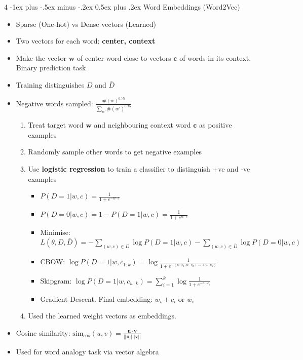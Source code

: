 \documentclass[10pt, landscape]{article}
\makeatletter
\renewcommand{\subsection}{\@startsection{subsection}{2}{0mm}%
  {-1ex plus -.5ex minus -.2ex}%
  {0.5ex plus .2ex}%
{\normalfont\normalsize\bfseries}}
\makeatother
\begin{document}
\begin{multicols*}{4}
  \subsection{Word Embeddings (Word2Vec)}    
  \begin{itemize}
    \item Sparse (One-hot) vs Dense vectors (Learned)
    \item Two vectors for each word: \textbf{center, context}
    \item Make the vector $\mathbf{w}$ of center word close to vectors $\mathbf{c}$ of words in its context. Binary prediction task
    \item Training distinguishes $D$ and $\bar{D}$
    \item Negative words sampled: $\frac{\#(w)^{0.75}}{\sum_{w'} \# (w')^0.75}$
    \begin{enumerate}
      \item Treat target word $\mathbf{w}$ and neighbouring context word $\mathbf{c}$ as positive examples
      \item Randomly sample other words to get negative examples
      \item Use \textbf{logistic regression} to train a classifier to distinguish +ve and -ve examples
      \begin{itemize}
        \item $P(D=1|w,c) = \frac{1}{1+e^{-w \cdot c}}$
        \item $P(D=0|w,c) = 1 - P(D=1|w,c) = \frac{1}{1+e^{w \cdot c}}$
        \item Minimise: $L(\theta, D, \bar{D}) = - \sum_{(w,c) \in D} \log P(D=1|w,c) - \sum_{(w,c) \in \bar{D}} \log P(D=0|w,c)$
        \item CBOW: $\log P(D=1|w,c_{1:k}) = \log \frac{1}{1 + e^{-(w \cdot c_1, w \cdot c_2+ \dots + w \cdot c_k)}}$
        \item Skipgram: $\log P(D=1|w,c_{w:k}) = \sum_{i=1}^{k} \log \frac{1}{1+e^{-w \cdot c_i}}$
        \item Gradient Descent. Final embedding: $w_i + c_i \text{ or } w_i$
      \end{itemize}
      \item Used the learned weight vectors as embeddings.
    \end{enumerate}
    \item Cosine similarity: $\text{sim}_{cos}(u,v) = \frac{\mathbf{u \cdot v}}{\mathbf{||u||||v||}}$
    \item Used for word analogy task via vector algebra
  \end{itemize}


\end{multicols*}
\end{document}
